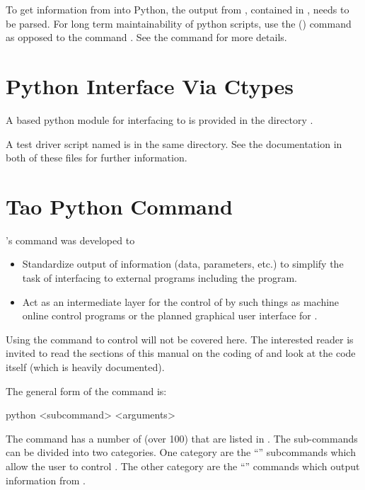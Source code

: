 To get information from \tao into Python, the output from \tao,
contained in , needs to be parsed. For long term
maintainability of python scripts, use the  () command 
as opposed to the  command . See the  command for more details.

\section{Python Interface Via Ctypes}

A  based python module  for interfacing \tao to  is provided in
the directory .

A test driver script named  is in the same directory. See the documentation in
both of these files for further information.

\section{Tao Python Command}
\label{s:python.python}
\tao's  command was developed to
%
\begin{itemize}
\item 
Standardize output of information (data, parameters, etc.) to simplify the task of interfacing \tao
to external programs including the  program.
% 
\item 
Act as an intermediate layer for the control of \tao by such things as machine online control
programs or the planned graphical user interface for \tao.
\end{itemize}
Using the  command to control \tao will not be covered here. The interested reader is
invited to read the sections of this manual on the coding of \tao and look at the \tao code itself
(which is heavily documented).

The general form of the  command is:
\begin{example}
  python <subcommand> <arguments>
\end{example}
The  command has a number of  (over 100) that are listed in
. The sub-commands can be divided into two categories. One category are the
``'' subcommands which allow the user to control \tao. The other category are the
``'' commands which output information from \tao.

